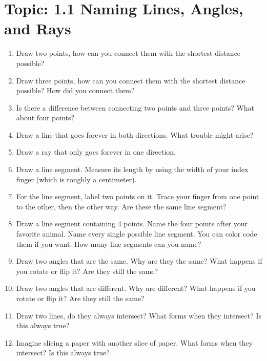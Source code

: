 \documentclass[12pt,letterpaper]{article}
\begin{document}
\section*{Topic: 1.1 Naming Lines, Angles, and Rays}
\begin{enumerate}
    \item Draw two points, how can you connect them with the shortest distance possible?
    \item Draw three points, how can you connect them with the shortest distance possible? How did you connect them?
    \item Is there a difference between connecting two points and three points? What about four points?
    \item Draw a line that goes forever in both directions. What trouble might arise?
    \item Draw a ray that only goes forever in one direction.
    \item Draw a line segment. Measure its length by using the width of your index finger (which is roughly a centimeter).
    \item For the line segment, label two points on it. Trace your finger from one point to the other, then the other way. Are these the same line segment?
    \item Draw a line segment containing 4 points. Name the four points after your favorite animal. Name every single possible line segment. You can color code them if you want. How many line segments can you name?
    \item Draw two angles that are the same. Why are they the same? What happens if you rotate or flip it? Are they still the same?
    \item Draw two angles that are different. Why are different? What happens if you rotate or flip it? Are they still the same?
    \item Draw two lines, do they always intersect? What forms when they intersect? Is this always true?
    \item Imagine slicing a paper with another slice of paper. What forms when they intersect? Is this always true?
\end{enumerate}
\end{document}
